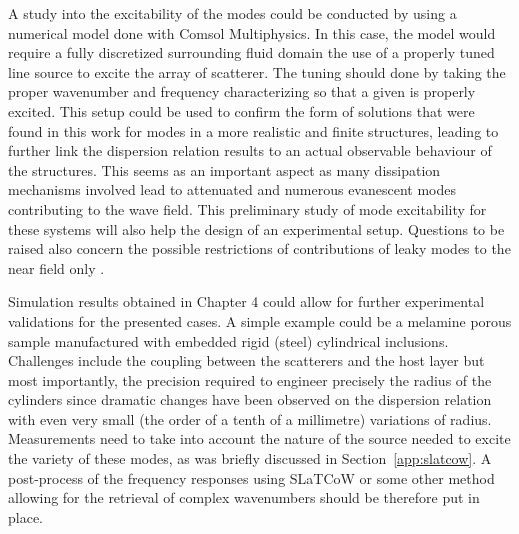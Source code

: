 A study into the excitability of the modes could be conducted by using a numerical model done with Comsol Multiphysics. In this case, the model would require a fully discretized surrounding fluid domain the use of a properly tuned line source to excite the array of scatterer. The tuning should done by taking the proper wavenumber and frequency characterizing so that a given is properly excited. This setup could be used to confirm the form of solutions that were found in this work for modes in a more realistic and finite structures, leading to further link the dispersion relation results to an actual observable behaviour of the structures. This seems as an important aspect as many dissipation mechanisms involved lead to attenuated and numerous evanescent modes contributing to the wave field. This preliminary study of mode excitability for these systems will also help the design of an experimental setup. Questions to be raised also concern the possible restrictions of contributions of leaky modes to the near field only \cite{sapozhnikov2007,nedospasov2017,abbaszadeh2024}.

Simulation results obtained in Chapter 4 could allow for further experimental validations for the presented cases. A simple example could be a melamine porous sample manufactured with embedded rigid (steel) cylindrical inclusions. Challenges include the coupling between the scatterers and the host layer but most importantly, the precision required to engineer precisely the radius of the cylinders since dramatic changes have been observed on the dispersion relation with even very small (the order of a tenth of a millimetre) variations of radius. Measurements need to take into account the nature of the source needed to excite the variety of these modes, as was briefly discussed in Section~\ref{app:slatcow}. A post-process of the frequency responses using SLaTCoW \cite{geslain2016} or some other method allowing for the retrieval of complex wavenumbers should be therefore put in place.